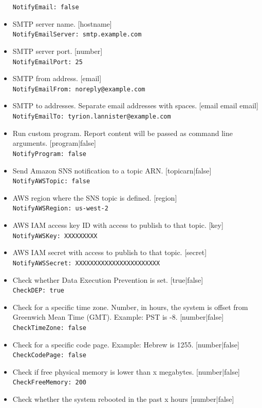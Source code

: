 \documentclass[11pt]{article}
\begin{document}
\begin{itemize}
\texttt{NotifyEmail: false}
\item SMTP server name. [hostname]\\
\texttt{NotifyEmailServer: smtp.example.com}
\item SMTP server port. [number]\\
\texttt{NotifyEmailPort: 25}
\item SMTP from address. [email]\\
\texttt{NotifyEmailFrom: noreply@example.com}
\item SMTP to addresses. Separate email addresses with spaces. [email email email]\\
\texttt{NotifyEmailTo: tyrion.lannister@example.com}
\item Run custom program. Report content will be passed as command line arguments. [program|false]\\
\texttt{NotifyProgram: false}
\item Send Amazon SNS notification to a topic ARN. [topicarn|false]\\
\texttt{NotifyAWSTopic: false}
\item AWS region where the SNS topic is defined. [region]\\
\texttt{NotifyAWSRegion: us-west-2}
\item AWS IAM access key ID with access to publish to that topic. [key]\\
\texttt{NotifyAWSKey: XXXXXXXXX}
\item AWS IAM secret with access to publish to that topic. [secret]\\
\texttt{NotifyAWSSecret: XXXXXXXXXXXXXXXXXXXXXXX}
\item Check whether Data Execution Prevention is set. [true|false]\\
\texttt{CheckDEP: true}
\item Check for a specific time zone. Number, in hours, the system is offset from Greenwich Mean Time (GMT). Example: PST is -8. [number|false]\\
\texttt{CheckTimeZone: false}
\item Check for a specific code page. Example: Hebrew is 1255. [number|false]\\
\texttt{CheckCodePage: false}
\item Check if free physical memory is lower than x megabytes. [number|false]\\
\texttt{CheckFreeMemory: 200}
\item Check whether the system rebooted in the past x hours [number|false]\\

\end{itemize}
\end{document}
